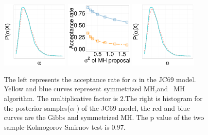   \begin{figure}[H]
  \centering

  \begin{minipage}[!hp]{0.99\linewidth}
  	\centering
    \includegraphics [width=0.3\textwidth, angle=0]{figs/JC_ks/jc_hist_44_05_3_.pdf}
    \includegraphics [width=0.3\textwidth, angle=0]{figs/acc/JCalpha_k2.pdf}
	\hspace{.5in}
    \includegraphics [width=0.3\textwidth, angle=0]{figs/JC_ks/jc_hist_44_05_3_.pdf}
  \end{minipage}
    \caption{The left represents the acceptance rate for $\alpha$ in the JC69 model.  Yellow and blue curves represent symmetrized MH,and \naive\ MH  algorithm. The multiplicative factor is $2$.The right is histogram for the posterior samples($\alpha$ ) of the JC69 model, the red and blue curves are the Gibbs and symmetrized MH. The p value of the two sample-Kolmogorov Smirnov test is $ 0.97$.  }
     \label{fig:ACC_JC}
  \end{figure}
  
